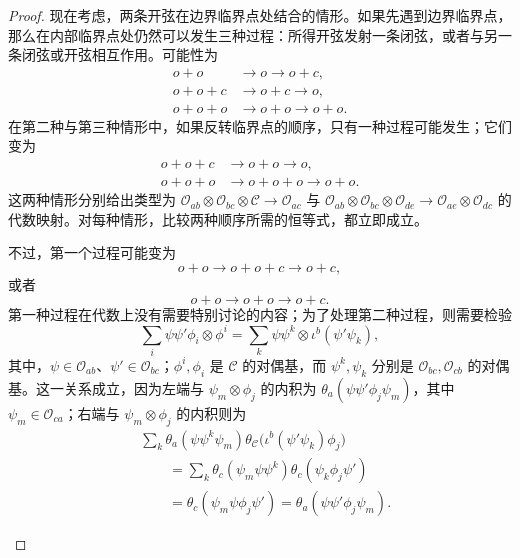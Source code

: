 \begin{proof}
现在考虑，两条开弦在边界临界点处结合的情形。如果先遇到边界临界点，那么在内部临界点处仍然可以发生三种过程：所得开弦发射一条闭弦，或者与另一条闭弦或开弦相互作用。可能性为
\[
\begin{aligned}
o+o&\longrightarrow o\longrightarrow o+c,\\
o+o+c&\longrightarrow o+c\longrightarrow o,\\
o+o+o&\longrightarrow o+o\longrightarrow o+o.
\end{aligned}
\]
在第二种与第三种情形中，如果反转临界点的顺序，只有一种过程可能发生；它们变为
\[
\begin{aligned}
o+o+c&\longrightarrow o+o\longrightarrow o,\\
o+o+o&\longrightarrow o+o+o\longrightarrow o+o.
\end{aligned}
\]
这两种情形分别给出类型为 $\mathcal{O}_{ab}\otimes\mathcal{O}_{bc}\otimes\mathcal{C}\to\mathcal{O}_{ac}$ 与 $\mathcal{O}_{ab}\otimes\mathcal{O}_{bc}\otimes\mathcal{O}_{de}\to\mathcal{O}_{ae}\otimes\mathcal{O}_{dc}$ 的代数映射。对每种情形，比较两种顺序所需的恒等式，都立即成立。

不过，第一个过程可能变为
\[
o+o\longrightarrow o+o+c\longrightarrow o+c,
\]
或者
\[
o+o\longrightarrow o+o\longrightarrow o+c.
\]
第一种过程在代数上没有需要特别讨论的内容；为了处理第二种过程，则需要检验
\[
\sum_i\psi\psi'\phi_i\otimes\phi^i
=\sum_k\psi\psi^k\otimes\iota^b(\psi'\psi_k),
\]
其中，$\psi\in\mathcal{O}_{ab}$、$\psi'\in\mathcal{O}_{bc}$；$\phi^i,\phi_i$ 是 $\mathcal{C}$ 的对偶基，而 $\psi^k,\psi_k$ 分别是 $\mathcal{O}_{bc},\mathcal{O}_{cb}$ 的对偶基。这一关系成立，因为左端与 $\psi_m\otimes\phi_j$ 的内积为 $\theta_a(\psi\psi'\phi_j\psi_m)$，其中 $\psi_m\in\mathcal{O}_{ca}$；右端与 $\psi_m\otimes\phi_j$ 的内积则为
\begin{equation}\label{eq:2.112}
\begin{aligned}
&\sum_k\theta_a(\psi\psi^k\psi_m)\theta_{\mathcal{C}}\bigl(\iota^b(\psi'\psi_k)\phi_j\bigr)\\
&\qquad=\sum_k\theta_c(\psi_m\psi\psi^k)\theta_c(\psi_k\phi_j\psi')\\
&\qquad=\theta_c(\psi_m\psi\phi_j\psi')
=\theta_a(\psi\psi'\phi_j\psi_m).
\end{aligned}
\end{equation}

\begin{figure}[H]
\centering
{}
\BookNumberOnlyCaption\label{fig:2.41}
\end{figure}


\end{proof}
